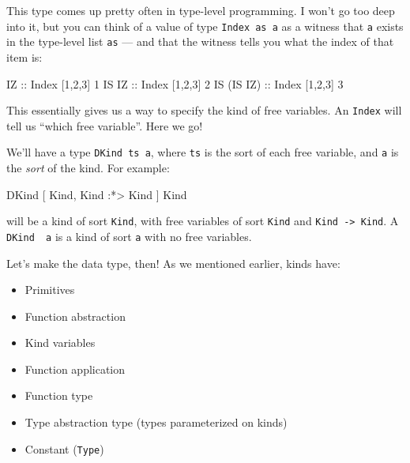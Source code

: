 \documentclass[]{article}
\newenvironment{Shaded}{}{}
\newcommand{\DataTypeTok}[1]{\textcolor[rgb]{0.56,0.13,0.00}{#1}}
\newcommand{\DecValTok}[1]{\textcolor[rgb]{0.25,0.63,0.44}{#1}}
\newcommand{\NormalTok}[1]{#1}
\newcommand{\OperatorTok}[1]{\textcolor[rgb]{0.40,0.40,0.40}{#1}}
\newcommand{\OtherTok}[1]{\textcolor[rgb]{0.00,0.44,0.13}{#1}}
\begin{document}
This type comes up pretty often in type-level programming. I won't go too deep
into it, but you can think of a value of type \texttt{Index\ as\ a} as a witness
that \texttt{a} exists in the type-level list \texttt{as} --- and that the
witness tells you what the index of that item is:

\begin{Shaded}
\begin{Highlighting}[]
\DataTypeTok{IZ}\OtherTok{         ::} \DataTypeTok{Index}\NormalTok{ \textquotesingle{}[}\DecValTok{1}\NormalTok{,}\DecValTok{2}\NormalTok{,}\DecValTok{3}\NormalTok{] }\DecValTok{1}
\DataTypeTok{IS} \DataTypeTok{IZ}\OtherTok{      ::} \DataTypeTok{Index}\NormalTok{ \textquotesingle{}[}\DecValTok{1}\NormalTok{,}\DecValTok{2}\NormalTok{,}\DecValTok{3}\NormalTok{] }\DecValTok{2}
\DataTypeTok{IS}\NormalTok{ (}\DataTypeTok{IS} \DataTypeTok{IZ}\NormalTok{)}\OtherTok{ ::} \DataTypeTok{Index}\NormalTok{ \textquotesingle{}[}\DecValTok{1}\NormalTok{,}\DecValTok{2}\NormalTok{,}\DecValTok{3}\NormalTok{] }\DecValTok{3}
\end{Highlighting}
\end{Shaded}

This essentially gives us a way to specify the kind of free variables. An
\texttt{Index} will tell us ``which free variable''. Here we go!

We'll have a type \texttt{DKind\ ts\ a}, where \texttt{ts} is the sort of each
free variable, and \texttt{a} is the \emph{sort} of the kind. For example:

\begin{Shaded}
\begin{Highlighting}[]
\DataTypeTok{DKind}\NormalTok{ \textquotesingle{}[ }\DataTypeTok{\textquotesingle{}Kind}\NormalTok{, }\DataTypeTok{\textquotesingle{}Kind}\NormalTok{ \textquotesingle{}}\OperatorTok{:*\textgreater{}} \DataTypeTok{\textquotesingle{}Kind}\NormalTok{ ] }\DataTypeTok{\textquotesingle{}Kind}
\end{Highlighting}
\end{Shaded}

will be a kind of sort \texttt{Kind}, with free variables of sort \texttt{Kind}
and \texttt{Kind\ -\textgreater{}\ Kind}. A
\texttt{DKind\ \textquotesingle{}{[}{]}\ a} is a kind of sort \texttt{a} with no
free variables.

Let's make the data type, then! As we mentioned earlier, kinds have:

\begin{itemize}
\tightlist
\item
  Primitives
\item
  Function abstraction
\item
  Kind variables
\item
  Function application
\item
  Function type
\item
  Type abstraction type (types parameterized on kinds)
\item
  Constant (\texttt{Type})
\end{itemize}
\end{document}
